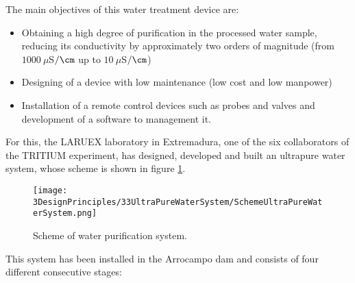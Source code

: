 The main objectives of this water treatment device are:

\begin{itemize}

\item{} Obtaining a high degree of purification in the processed water sample, reducing its conductivity by approximately two orders of magnitude (from $1000~\mu$S$/\cm$ up to $10~\mu$S$/\cm$)

\item{} Designing of a device with low maintenance (low cost  and low manpower)

\item{} Installation of a remote control devices such as probes and valves and development of a software to management it.
\end{itemize}

For this, the LARUEX laboratory in Extremadura, one of the six collaborators of the TRITIUM experiment, has designed, developed and built an ultrapure water system, whose scheme is shown in figure \ref{fig:WPSScheme}.

\begin{figure}[htbp]
\centering
\texttt{[image: 3DesignPrinciples/33UltraPureWaterSystem/SchemeUltraPureWaterSystem.png]}
\caption{Scheme of water purification system.\label{fig:WPSScheme}}
\end{figure}

This system has been installed in the Arrocampo dam and consists of four different consecutive stages:

